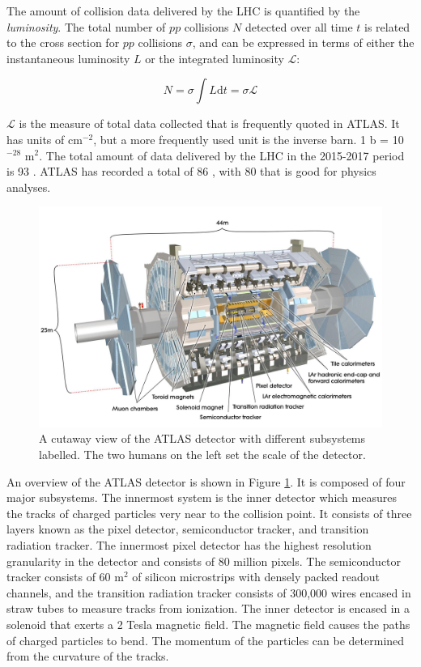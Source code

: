 The amount of \pp collision data delivered by the LHC is quantified by the \textit{luminosity}. The total number of $pp$ collisions $N$ detected over all time $t$ is related to the cross section for $pp$ collisions $\sigma$, and can be expressed in terms of either the instantaneous luminosity $L$ or the integrated luminosity $\mathcal{L}$:

\begin{equation}
N = \sigma \int{L} \text{d}t = \sigma \mathcal{L}
\end{equation}

\noindent $\mathcal{L}$ is the measure of total data collected that is frequently quoted in ATLAS. It has units of cm$^{-2}$, but a more frequently used unit is the inverse barn. 1 b = 10$^{-28}$ m$^2$. The total amount of data delivered by the LHC in the 2015-2017 period is 93 \ifb. ATLAS has recorded a total of 86 \ifb, with 80 \ifb that is good for physics analyses.

\begin{figure}[htb]
\centering
\includegraphics[width=1\textwidth]{Figures/atlas.jpg}
\caption{A cutaway view of the ATLAS detector with different subsystems labelled. The two humans on the left set the scale of the detector.}
\label{fig:atlas}
\end{figure}

An overview of the ATLAS detector is shown in Figure \ref{fig:atlas}. It is composed of four major subsystems. The innermost system is the inner detector which measures the tracks of charged particles very near to the collision point. It consists of three layers known as the pixel detector, semiconductor tracker, and transition radiation tracker. The innermost pixel detector has the highest resolution granularity in the detector and consists of 80 million pixels. The semiconductor tracker consists of 60 m$^2$ of silicon microstrips with densely packed readout channels, and the transition radiation tracker consists of 300,000 wires encased in straw tubes to measure tracks from ionization. The inner detector is encased in a solenoid that exerts a 2 Tesla magnetic field. The magnetic field causes the paths of charged particles to bend. The momentum of the particles can be determined from the curvature of the tracks.

